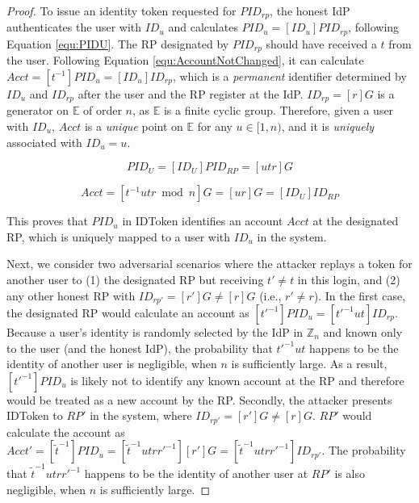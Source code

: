   \begin{proof}
    To issue an identity token requested for $PID_{rp}$, the 
    honest IdP authenticates the user with $ID_u$ and calculates 
    $PID_u = [ID_u]PID_{rp}$, following Equation \ref{equ:PIDU}. 
    The RP designated by $PID_{rp}$ should have received a $t$ 
    from the user. Following Equation \ref{equ:AccountNotChanged}, 
    it can calculate $Acct = [t^{-1}]PID_{u} = [ID_u]ID_{rp}$, 
    which is a \emph{permanent} identifier determined by $ID_u$ 
    and $ID_{rp}$ after the user and the RP register at the IdP. 
    $ID_{rp} = [r]G$ is a generator on $\mathbb{E}$ of order $n$, 
    as $\mathbb{E}$ is a finite cyclic group. Therefore, given a 
    user with $ID_u$, $Acct$ is a \emph{unique} point on 
    $\mathbb{E}$ for any $u \in [1, n)$, and it is \emph{uniquely} 
    associated with $ID_u=u$. 
    
    \begin{equation}
      PID_{U} = [{ID_U}]{PID_{RP}} = [utr]G
       \label{equ:PIDU}
    \end{equation}
  
    \begin{equation}
      Acct =  [t^{-1}utr \bmod n]G = [ur]G = [ID_U]ID_{RP}
      \label{equ:AccountNotChanged}
    \end{equation}
  
    This proves that $PID_u$ in IDToken identifies an account 
    $Acct$ at the designated RP, which is uniquely mapped to a 
    user with $ID_u$ in the system.
  
    Next, we consider two adversarial scenarios where the 
    attacker replays a token for another user to (1) the 
    designated RP but receiving $t'\neq t$ in this login, and 
    (2) any other honest RP with $ID_{rp'} = [r']G \neq [r]G$ 
    (i.e., $r' \neq r$). In the first case, the designated RP 
    would calculate an account as $[t'^{-1}]PID_u = [t'^{-1}ut]ID_{rp}$.
    Because a user's identity is randomly selected by the IdP 
    in $\mathbb{Z}_n$ and known only to the user (and the honest 
    IdP), the probability that $t'^{-1}ut$ happens to be the 
    identity of another user is negligible, when $n$ is 
    sufficiently large. As a result, $[t'^{-1}]PID_u$ is likely 
    not to identify any known account at the RP and therefore 
    would be treated as a new account by the RP. 
    Secondly, the attacker presents IDToken to $RP'$ in the 
    system, where $ID_{rp'} = [r']G \neq [r]G$. $RP'$ would 
    calculate the account as $Acct' = [\tilde{t}^{-1}]PID_{u} = 
    [\tilde{t}^{-1}utrr'^{-1}][r']G = 
    [\tilde{t}^{-1}utrr'^{-1}]ID_{rp'}$. 
    The probability that $\tilde{t}^{-1}utrr'^{-1}$ happens to 
    be the identity of another user at $RP'$ is also negligible, 
    when $n$ is sufficiently large. 
  \hfill
  \end{proof}
  
